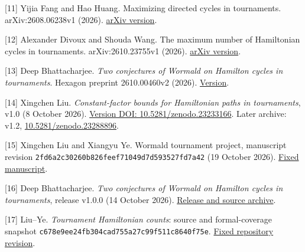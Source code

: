 \documentclass[11pt,a4paper]{article}
\begin{document}
{[}11{]} Yijia Fang and Hao Huang. Maximizing directed cycles in tournaments. arXiv:2608.06238v1 (2026). \href{https://arxiv.org/html/2608.06238v1\#S3}{arXiv version}.

{[}12{]} Alexander Divoux and Shouda Wang. The maximum number of Hamiltonian cycles in tournaments. arXiv:2610.23755v1 (2026). \href{https://arxiv.org/html/2610.23755v1}{arXiv version}.

{[}13{]} Deep Bhattacharjee. \emph{Two conjectures of Wormald on Hamilton cycles in tournaments}. Hexagon preprint 2610.00460v2 (2026). \href{https://hexagonmath.org/2610.00460v2}{Version}.

{[}14{]} Xingchen Liu. \emph{Constant-factor bounds for Hamiltonian paths in tournaments}, v1.0 (8 October 2026). \href{https://doi.org/10.5281/zenodo.23233166}{Version DOI: 10.5281/zenodo.23233166}. Later archive: v1.2, \href{https://doi.org/10.5281/zenodo.23288896}{10.5281/zenodo.23288896}.

{[}15{]} Xingchen Liu and Xiangyu Ye. Wormald tournament project, manuscript revision \nolinkurl{2fd6a2c30260b826feef71049d7d593527fd7a42} (19 October 2026). \href{https://github.com/LStar404/wormald-tournament-conjectures/blob/2fd6a2c30260b826feef71049d7d593527fd7a42/docs/paper.zh.md}{Fixed manuscript}.

{[}16{]} Deep Bhattacharjee. \emph{Two conjectures of Wormald on Hamilton cycles in tournaments}, release v1.0.0 (14 October 2026). \href{https://github.com/creelie/Breakthrough-problems-1/releases/tag/v1.0.0}{Release and source archive}.

{[}17{]} Liu--Ye. \emph{Tournament Hamiltonian counts}: source and formal-coverage snapshot \nolinkurl{c678e9ee24fb304cad755a27c99f511c8640f75e}. \href{https://github.com/LStar404/tournament-hamiltonian-counts-20261028/tree/c678e9ee24fb304cad755a27c99f511c8640f75e}{Fixed repository revision}.
\end{document}
